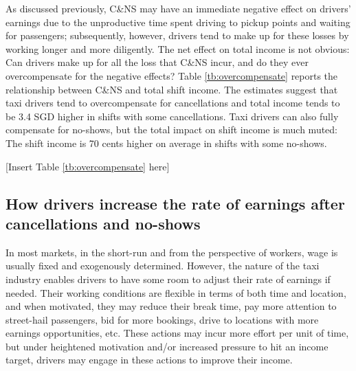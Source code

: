 \documentclass[reviewmode]{restat}
\begin{document}
As discussed previously, C\&NS may have an immediate negative effect on drivers' earnings due to the 
unproductive time spent driving to pickup points and waiting for passengers; subsequently, however, 
drivers tend to make up for these losses by working longer and more diligently. The net effect on total
income is not obvious: Can drivers make up for all the loss that C\&NS incur, and do they ever 
overcompensate for the negative effects? Table \ref{tb:overcompensate} reports the relationship between 
C\&NS and total shift income.
The estimates suggest that taxi drivers tend to overcompensate for cancellations %
and total income tends to be 3.4 SGD higher in shifts with some cancellations.
Taxi drivers can also fully compensate for no-shows, but the total impact on shift income is much muted:
The shift income is 70 cents higher on average in shifts with some no-shows.

\begin{center}
	[Insert Table \ref{tb:overcompensate} here]
\end{center}

\subsection{How drivers increase the rate of earnings after cancellations and no-shows}
In most markets, in the short-run and from the perspective of workers, wage is usually fixed and exogenously
determined. However, the nature of the taxi industry enables drivers to have some room to adjust their rate 
of earnings if needed. Their working conditions are flexible in terms of both time and location, and when
motivated, they may reduce their break time, pay more attention to street-hail passengers, bid for more bookings,
drive to locations with more earnings opportunities, etc. These actions may incur more effort per unit of
time, but under heightened motivation and/or increased pressure to hit an income target, drivers may engage 
in these actions to improve their income.
\end{document}
